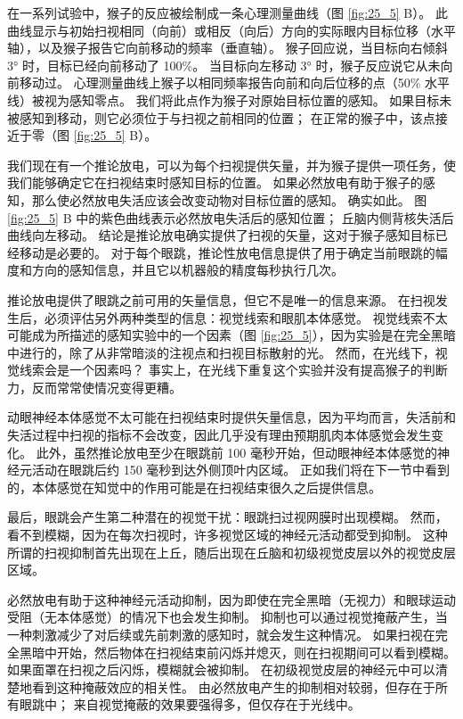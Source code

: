 在一系列试验中，猴子的反应被绘制成一条心理测量曲线（图 \ref{fig:25_5} B）。 此曲线显示与初始扫视相同（向前）或相反（向后）方向的实际眼内目标位移（水平轴），以及猴子报告它向前移动的频率（垂直轴）。 猴子回应说，当目标向右倾斜 3° 时，目标已经向前移动了 100\%。 当目标向左移动 3° 时，猴子反应说它从未向前移动过。 心理测量曲线上猴子以相同频率报告向前和向后位移的点（50\% 水平线）被视为感知零点。 我们将此点作为猴子对原始目标位置的感知。 如果目标未被感知到移动，则它必须位于与扫视之前相同的位置； 在正常的猴子中，该点接近于零（图 \ref{fig:25_5} B）。

我们现在有一个推论放电，可以为每个扫视提供矢量，并为猴子提供一项任务，使我们能够确定它在扫视结束时感知目标的位置。 如果必然放电有助于猴子的感知，那么使必然放电失活应该会改变动物对目标位置的感知。 确实如此。 图 \ref{fig:25_5} B 中的紫色曲线表示必然放电失活后的感知位置； 丘脑内侧背核失活后曲线向左移动。 结论是推论放电确实提供了扫视的矢量，这对于猴子感知目标已经移动是必要的。 对于每个眼跳，推论性放电信息提供了用于确定当前眼跳的幅度和方向的感知信息，并且它以机器般的精度每秒执行几次。

推论放电提供了眼跳之前可用的矢量信息，但它不是唯一的信息来源。 在扫视发生后，必须评估另外两种类型的信息：视觉线索和眼肌本体感觉。 视觉线索不太可能成为所描述的感知实验中的一个因素（图 \ref{fig:25_5}），因为实验是在完全黑暗中进行的，除了从非常暗淡的注视点和扫视目标散射的光。 然而，在光线下，视觉线索会是一个因素吗？ 事实上，在光线下重复这个实验并没有提高猴子的判断力，反而常常使情况变得更糟。

动眼神经本体感觉不太可能在扫视结束时提供矢量信息，因为平均而言，失活前和失活过程中扫视的指标不会改变，因此几乎没有理由预期肌肉本体感觉会发生变化。 此外，虽然推论放电至少在眼跳前 100 毫秒开始，但动眼神经本体感觉的神经元活动在眼跳后约 150 毫秒到达外侧顶叶内区域。 正如我们将在下一节中看到的，本体感觉在知觉中的作用可能是在扫视结束很久之后提供信息。

最后，眼跳会产生第二种潜在的视觉干扰：眼跳扫过视网膜时出现模糊。 然而，看不到模糊，因为在每次扫视时，许多视觉区域的神经元活动都受到抑制。 这种所谓的扫视抑制首先出现在上丘，随后出现在丘脑和初级视觉皮层以外的视觉皮层区域。

必然放电有助于这种神经元活动抑制，因为即使在完全黑暗（无视力）和眼球运动受阻（无本体感觉）的情况下也会发生抑制。 抑制也可以通过视觉掩蔽产生，当一种刺激减少了对后续或先前刺激的感知时，就会发生这种情况。 如果扫视在完全黑暗中开始，然后物体在扫视结束前闪烁并熄灭，则在扫视期间可以看到模糊。 如果面罩在扫视之后闪烁，模糊就会被抑制。 在初级视觉皮层的神经元中可以清楚地看到这种掩蔽效应的相关性。 由必然放电产生的抑制相对较弱，但存在于所有眼跳中； 来自视觉掩蔽的效果要强得多，但仅存在于光线中。


